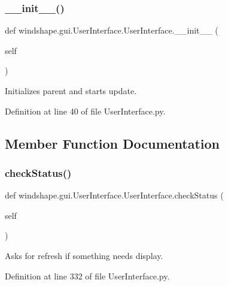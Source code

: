 \subsubsection{\texorpdfstring{\+\_\+\+\_\+init\+\_\+\+\_\+()}{\_\_init\_\_()}}
{\footnotesize\ttfamily def windshape.\+gui.\+User\+Interface.\+User\+Interface.\+\_\+\+\_\+init\+\_\+\+\_\+ (\begin{DoxyParamCaption}\item[{}]{self }\end{DoxyParamCaption})}

\begin{DoxyVerb}Initializes parent and starts update.\end{DoxyVerb}
 

Definition at line 40 of file User\+Interface.\+py.



\subsection{Member Function Documentation}
\mbox{\label{classwindshape_1_1gui_1_1_user_interface_1_1_user_interface_ad8bb352b43c5eab90c80d9bd205e1535}} 
\subsubsection{\texorpdfstring{check\+Status()}{checkStatus()}}
{\footnotesize\ttfamily def windshape.\+gui.\+User\+Interface.\+User\+Interface.\+check\+Status (\begin{DoxyParamCaption}\item[{}]{self }\end{DoxyParamCaption})}

\begin{DoxyVerb}Asks for refresh if something needs display.\end{DoxyVerb}
 

Definition at line 332 of file User\+Interface.\+py.

